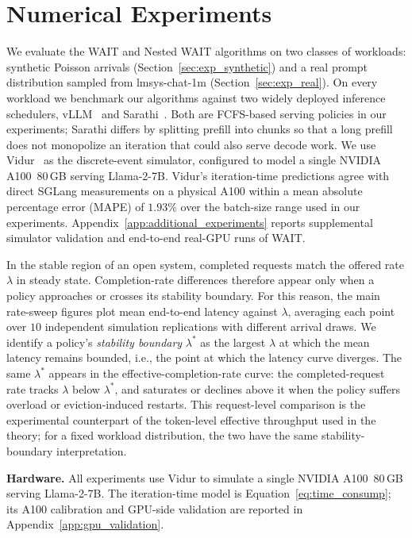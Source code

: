\section{Numerical Experiments}
\label{sec:experiments}

We evaluate the WAIT and Nested WAIT algorithms on two classes of workloads: synthetic Poisson arrivals (Section~\ref{sec:exp_synthetic}) and a real prompt distribution sampled from lmsys-chat-1m (Section~\ref{sec:exp_real}). On every workload we benchmark our algorithms against two widely deployed inference schedulers, vLLM~\citep{kwon2023efficient} and Sarathi~\citep{agrawal2023sarathi}. Both are FCFS-based serving policies in our experiments; Sarathi differs by splitting prefill into chunks so that a long prefill does not monopolize an iteration that could also serve decode work. We use Vidur~\citep{agrawal2024vidur} as the discrete-event simulator, configured to model a single NVIDIA A100~80\,GB serving Llama-2-7B. Vidur's iteration-time predictions agree with direct SGLang measurements on a physical A100 within a mean absolute percentage error (MAPE) of $1.93\%$ over the batch-size range used in our experiments. Appendix~\ref{app:additional_experiments} reports supplemental simulator validation and end-to-end real-GPU runs of WAIT.

In the stable region of an open system, completed requests match the offered rate $\lambda$ in steady state. Completion-rate differences therefore appear only when a policy approaches or crosses its stability boundary. For this reason, the main rate-sweep figures plot mean end-to-end latency against $\lambda$, averaging each point over $10$ independent simulation replications with different arrival draws. We identify a policy's \emph{stability boundary} $\lambda^*$ as the largest $\lambda$ at which the mean latency remains bounded, i.e., the point at which the latency curve diverges. The same $\lambda^*$ appears in the effective-completion-rate curve: the completed-request rate tracks $\lambda$ below $\lambda^*$, and saturates or declines above it when the policy suffers overload or eviction-induced restarts. This request-level comparison is the experimental counterpart of the token-level effective throughput used in the theory; for a fixed workload distribution, the two have the same stability-boundary interpretation.

\textbf{Hardware.} All experiments use Vidur to simulate a single NVIDIA A100~80\,GB serving Llama-2-7B. The iteration-time model is Equation~\eqref{eq:time_consump}; its A100 calibration and GPU-side validation are reported in Appendix~\ref{app:gpu_validation}.

